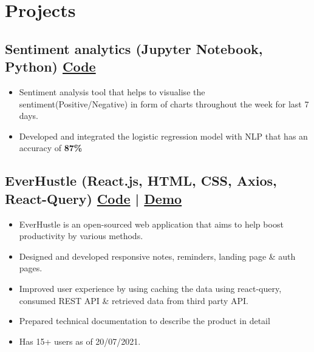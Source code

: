 \documentclass[a4,10pt]{article}
\newenvironment{zitemize}{
\begin{itemize}\itemsep0pt \parskip0pt \parsep1pt}
{\end{itemize}\vspace{-0.5cm}}
\begin{document}
\section{Projects} %



\subsection*{Sentiment analytics {\normalsize\normalfont (Jupyter Notebook, Python)} \hfill {\href{https://github.com/DevelopersLeague/Brandlytics}{Code} }} 
    \begin{zitemize}
        \item Sentiment analysis tool that helps to visualise the sentiment(Positive/Negative) in form of charts throughout the week for last 7 days. 
        \item Developed and integrated the logistic regression model with NLP that has an accuracy of \textbf{87\%} 
    \end{zitemize}


\subsection*{EverHustle {\normalsize\normalfont (React.js, HTML, CSS, Axios, React-Query)} \hfill {\href{https://github.com/DevelopersLeague/EverHustle-FrontEnd}{Code} } | {\href{https://everhustle.netlify.app/}{Demo} }} 
    \begin{zitemize}
        \item EverHustle is an open-sourced web application that aims to help boost productivity by various methods. 
        \item Designed and developed responsive notes, reminders, landing page \& auth pages.
        \item Improved user experience by using caching the data using react-query, consumed REST API \& retrieved data
        from third party API.
        \item Prepared technical documentation to describe the product in detail
        \item Has 15+ users as of 20/07/2021.
    \end{zitemize}
\end{document}
